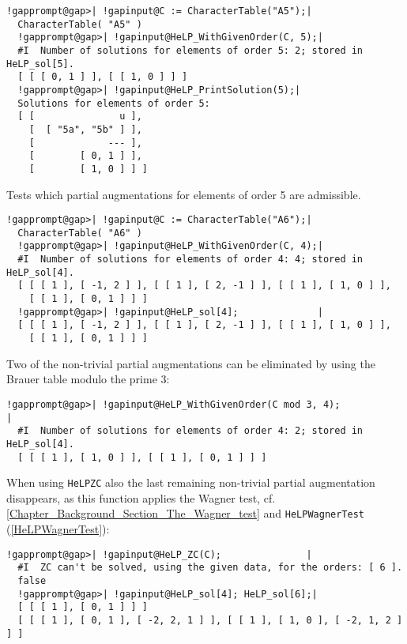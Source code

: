 \documentclass[a4paper,11pt]{report}
\begin{document}
{{ 
\begin{Verbatim}[commandchars=!@|,fontsize=\small,frame=single,label=Example]
  !gapprompt@gap>| !gapinput@C := CharacterTable("A5");|
  CharacterTable( "A5" )
  !gapprompt@gap>| !gapinput@HeLP_WithGivenOrder(C, 5);|
  #I  Number of solutions for elements of order 5: 2; stored in HeLP_sol[5].
  [ [ [ 0, 1 ] ], [ [ 1, 0 ] ] ]
  !gapprompt@gap>| !gapinput@HeLP_PrintSolution(5);|
  Solutions for elements of order 5:
  [ [               u ],
    [  [ "5a", "5b" ] ],
    [             --- ],
    [        [ 0, 1 ] ],
    [        [ 1, 0 ] ] ]
\end{Verbatim}
 Tests which partial augmentations for elements of order 5 are admissible. 
\begin{Verbatim}[commandchars=!@|,fontsize=\small,frame=single,label=Example]
  !gapprompt@gap>| !gapinput@C := CharacterTable("A6");|
  CharacterTable( "A6" )
  !gapprompt@gap>| !gapinput@HeLP_WithGivenOrder(C, 4);|
  #I  Number of solutions for elements of order 4: 4; stored in HeLP_sol[4].
  [ [ [ 1 ], [ -1, 2 ] ], [ [ 1 ], [ 2, -1 ] ], [ [ 1 ], [ 1, 0 ] ], 
    [ [ 1 ], [ 0, 1 ] ] ]
  !gapprompt@gap>| !gapinput@HeLP_sol[4];              |
  [ [ [ 1 ], [ -1, 2 ] ], [ [ 1 ], [ 2, -1 ] ], [ [ 1 ], [ 1, 0 ] ], 
    [ [ 1 ], [ 0, 1 ] ] ]
\end{Verbatim}
 Two of the non-trivial partial augmentations can be eliminated by using the
Brauer table modulo the prime $3$: 
\begin{Verbatim}[commandchars=!@|,fontsize=\small,frame=single,label=Example]
  !gapprompt@gap>| !gapinput@HeLP_WithGivenOrder(C mod 3, 4);                                                                    |
  #I  Number of solutions for elements of order 4: 2; stored in HeLP_sol[4].
  [ [ [ 1 ], [ 1, 0 ] ], [ [ 1 ], [ 0, 1 ] ] ]
\end{Verbatim}
 When using \texttt{HeLP{\textunderscore}ZC} also the last remaining non-trivial partial augmentation disappears, as this
function applies the Wagner test, cf. \ref{Chapter_Background_Section_The_Wagner_test} and \texttt{HeLP{\textunderscore}WagnerTest} (\ref{HeLPWagnerTest}): 
\begin{Verbatim}[commandchars=!@|,fontsize=\small,frame=single,label=Example]
  !gapprompt@gap>| !gapinput@HeLP_ZC(C);               |
  #I  ZC can't be solved, using the given data, for the orders: [ 6 ].
  false
  !gapprompt@gap>| !gapinput@HeLP_sol[4]; HeLP_sol[6];|
  [ [ [ 1 ], [ 0, 1 ] ] ]
  [ [ [ 1 ], [ 0, 1 ], [ -2, 2, 1 ] ], [ [ 1 ], [ 1, 0 ], [ -2, 1, 2 ] ] ]
\end{Verbatim}
}}
\end{document}
